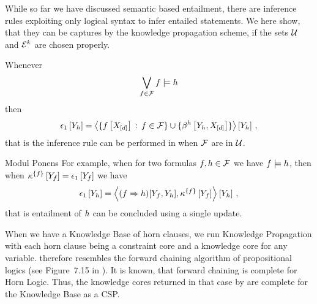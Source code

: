 
While so far we have discussed semantic based entailment, there are inference rules exploiting only logical syntax to infer entailed statements.
We here show, that they can be captures by the knowledge propagation scheme, if the sets $\mathcal{U}$ and $\mathcal{E}^{k}$ are chosen properly.

Whenever
\begin{align*}
    \bigvee_{f\in\mathcal{F}} f \models h
\end{align*}
then
\begin{align*}
    \epsilon_1\left[Y_{h}\right] =
    \left\langle \{f\left[X_{[d]}\right] \, : \, f\in\mathcal{F}\} \cup \{\beta^{h}\left[Y_{h},X_{[d]}\right]\}\right\rangle \left[ Y_{h} \right] \, ,
\end{align*}
that is the inference rule can be performed in when $\mathcal{F}$ are in $\mathcal{U}$.

\begin{example}{Modul Ponens}
    For example, when for two formulas $f,h\in\mathcal{F}$ we have $f\models h$, then when $\kappa^{\{f\}}\left[Y_{f}\right] = \epsilon_1\left[Y_{f}\right]$ we have
    \begin{align*}
        \epsilon_1\left[Y_{h}\right]
        = \left\langle (f\Rightarrow h)[Y_{f},Y_{h}],\kappa^{\{f\}}\left[Y_{f}\right]\right\rangle \left[ Y_{h} \right] \, ,
    \end{align*}
    that is entailment of $h$ can be concluded using a single update.

    When we have a Knowledge Base of horn clauses, we run Knowledge Propagation with each horn clause being a constraint core and a knowledge core for any variable.
     therefore resembles the forward chaining algorithm of propositional logics (see Figure~7.15 in \cite{russell_artificial_2021}).
    It is known, that forward chaining is complete for Horn Logic.
    Thus, the knowledge cores returned in that case by  are complete for the Knowledge Base as a CSP.
\end{example}




